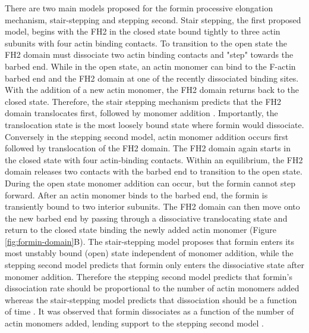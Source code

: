 There are two main models proposed for the formin processive elongation mechanism, stair-stepping and stepping second. Stair stepping, the first proposed model, begins with the FH2 in the closed state bound tightly to three actin subunits with four actin binding contacts. To transition to the open state the FH2 domain must dissociate two actin binding contacts and "step" towards the barbed end. While in the open state, an actin monomer can bind to the F-actin barbed end and the FH2 domain at one of the recently dissociated binding sites. With the addition of a new actin monomer, the FH2 domain returns back to the closed state. Therefore, the stair stepping mechanism predicts that the FH2 domain translocates first, followed by monomer addition \citep{otomo_structural_2005}. Importantly, the translocation state is the most loosely bound state where formin would dissociate. Conversely in the stepping second model, actin monomer addition occurs first followed by translocation of the FH2 domain. The FH2 domain again starts in the closed state with four actin-binding contacts. Within an equilibrium, the FH2 domain releases two contacts with the barbed end to transition to the open state. During the open state monomer addition can occur, but the formin cannot step forward. After an actin monomer binds to the barbed end, the formin is transiently bound to two interior subunits. The FH2 domain can then move onto the new barbed end by passing through a dissociative translocating state and return to the closed state binding the newly added actin monomer \citep{paul_role_2008,paul_review_2009} (Figure \ref{fig:formin-domain}B). The stair-stepping model proposes that formin enters its most unstably bound (open) state independent of monomer addition, while the stepping second model predicts that formin only enters the dissociative state after monomer addition. Therefore the stepping second model predicts that formin's dissociation rate should be proportional to the number of actin monomers added whereas the stair-stepping model predicts that dissociation should be a function of time \citep{paul_review_2009}. It was observed that formin dissociates as a function of the number of actin monomers added, lending support to the stepping second model \citep{paul_role_2008}. 

